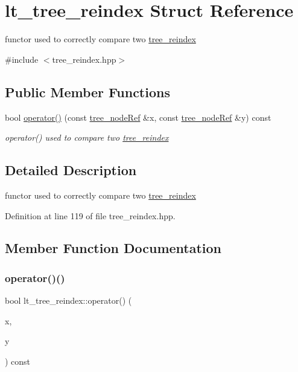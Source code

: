 \hypertarget{structlt__tree__reindex}{}\section{lt\+\_\+tree\+\_\+reindex Struct Reference}
\label{structlt__tree__reindex}


functor used to correctly compare two \hyperlink{classtree__reindex}{tree\+\_\+reindex}  




{\ttfamily \#include $<$tree\+\_\+reindex.\+hpp$>$}

\subsection*{Public Member Functions}
\begin{DoxyCompactItemize}
\item 
bool \hyperlink{structlt__tree__reindex_a98bc05ea7e31eda89f3caf58d5104e39}{operator()} (const \hyperlink{tree__node_8hpp_a6ee377554d1c4871ad66a337eaa67fd5}{tree\+\_\+node\+Ref} \&x, const \hyperlink{tree__node_8hpp_a6ee377554d1c4871ad66a337eaa67fd5}{tree\+\_\+node\+Ref} \&y) const
\begin{DoxyCompactList}\small\item\em operator() used to compare two \hyperlink{classtree__reindex}{tree\+\_\+reindex} \end{DoxyCompactList}\end{DoxyCompactItemize}


\subsection{Detailed Description}
functor used to correctly compare two \hyperlink{classtree__reindex}{tree\+\_\+reindex} 

Definition at line 119 of file tree\+\_\+reindex.\+hpp.



\subsection{Member Function Documentation}
\mbox{\label{structlt__tree__reindex_a98bc05ea7e31eda89f3caf58d5104e39}} 
\subsubsection{\texorpdfstring{operator()()}{operator()()}}
{\footnotesize\ttfamily bool lt\+\_\+tree\+\_\+reindex\+::operator() (\begin{DoxyParamCaption}\item[{const \hyperlink{tree__node_8hpp_a6ee377554d1c4871ad66a337eaa67fd5}{tree\+\_\+node\+Ref} \&}]{x,  }\item[{const \hyperlink{tree__node_8hpp_a6ee377554d1c4871ad66a337eaa67fd5}{tree\+\_\+node\+Ref} \&}]{y }\end{DoxyParamCaption}) const}




